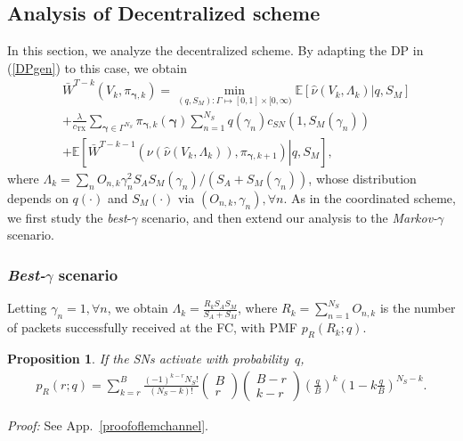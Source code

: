 \documentclass[10pt,twocolumn,twoside]{IEEEtran}
\newtheorem{propos}{Proposition}
\theoremstyle{plain}
\begin{document}
\subsection{Analysis of Decentralized scheme}
\label{deccentr}
\noindent In this section, we analyze the decentralized scheme.
By adapting the DP in (\ref{DPgen}) to this case, we obtain
\begin{align}
\label{DP}
&\bar W^{T-k}(V_{k},\pi_{\boldsymbol\gamma,k})
=
\min_{\!\!\!\!\!\!\!(q,S_M):\Gamma\mapsto[0,1]\times[0,\infty)\!\!\!\!\!\!\!}
\mathbb E\left[\left.\hat \nu\left(V_{k},\Lambda_k\right)\right|q,S_M\right]
\nonumber\\&
+
\frac{\lambda}{c_{\mathrm{TX}}} \!\!\!\sum_{\boldsymbol\gamma\in\Gamma^{N_S}}\pi_{\boldsymbol\gamma,k}(\boldsymbol\gamma)\sum_{n=1}^{N_S}q(\gamma_n) c_{SN}(1,S_{M}(\gamma_n))
\nonumber
\\&
+
\mathbb E\left[\left.
\bar W^{T-k-1}\left(\nu\left(\hat \nu\left(V_{k},\Lambda_k\right)\right),\pi_{\boldsymbol\gamma,k+1}\right)\right|q,S_M\right],
\end{align}
where
$\Lambda_k{=}\sum_{n}O_{n,k}\gamma_{n}^2S_AS_{M}(\gamma_{n})/(S_A{+}S_{M}(\gamma_{n}))$,
whose distribution depends on $q(\cdot)$ and $S_M(\cdot)$ via $(O_{n,k},\gamma_n),\forall n$.
As in the coordinated scheme, we first study the \emph{best}{-}$\gamma$ scenario, and then
 extend our analysis to the \emph{Markov-}$\gamma$ scenario.
\subsubsection{\emph{Best-}$\gamma$ scenario}
\label{bestomegadistr}
Letting $\gamma_n{=}1,\forall n$, we obtain $\Lambda_k{=}\frac{R_kS_AS_{M}}{S_A+S_{M}}$,
where $R_k{=}\sum_{n=1}^{N_S}O_{n,k}$ is the number of packets successfully received at 
the FC, with PMF $p_R(R_k;q)$.\begin{propos}
\label{psr}
If the SNs activate with probability~$q$,
 \begin{align*}
p_R(r;q)\!\!=\!\!
\sum_{k=r}^{B}\!
\frac{(-1)^{k-r}N_S!}{(N_S-k)!}\!\!
\left(\begin{array}{c}\!\!\!\!B\!\!\!\!\\\!\!\!\!r\!\!\!\!\end{array}\right)\!\!
\left(\begin{array}{c}\!\!\!B-r\!\!\!\\\!\!\!k-r\!\!\!\end{array}\right)\!\!
\left(\frac{q}{B}\right)^{k}\!\!
\left(1\!-\!k\frac{q}{B}\right)^{\!\!N_S-k}\!\!\!\!\!\!\!.
\end{align*}
\end{propos}
\noindent\emph{Proof:}
See App.~\ref{proofoflemchannel}.
\hfill\QED
\end{document}
